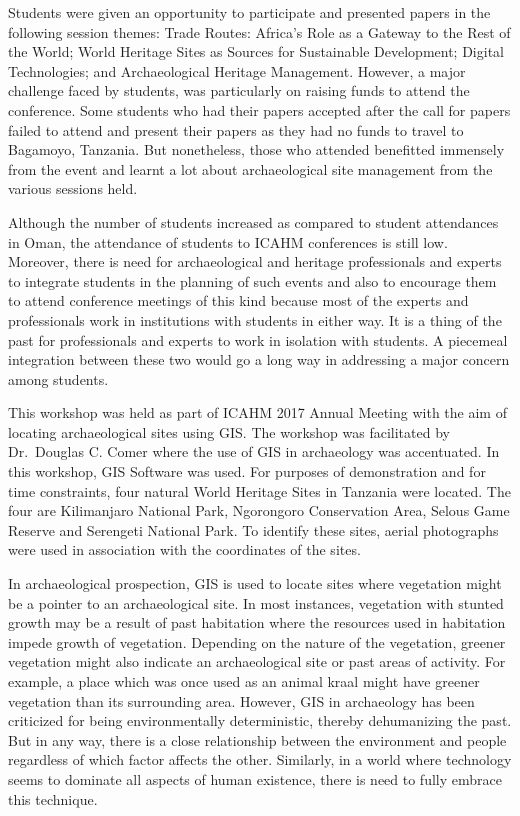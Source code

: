 Students were given an opportunity to participate and presented papers in the following session themes: Trade Routes: Africa's Role as a Gateway to the Rest of the World; World Heritage Sites as Sources for Sustainable Development; Digital Technologies; and Archaeological Heritage Management. However, a major challenge faced by students, was particularly on raising funds to attend the conference. Some students who had their papers accepted after the call for papers failed to attend and present their papers as they had no funds to travel to Bagamoyo, Tanzania. But nonetheless, those who attended benefitted immensely from the event and learnt a lot about archaeological site management from the various sessions held.

Although the number of students increased as compared to student attendances in Oman, the attendance of students to ICAHM conferences is still low. Moreover, there is need for archaeological and heritage professionals and experts to integrate students in the planning of such events and also to encourage them to attend conference meetings of this kind because most of the experts and professionals work in institutions with students in either way. It is a thing of the past for professionals and experts to work in isolation with students. A piecemeal integration between these two would go a long way in addressing a major concern among students.


This workshop was held as part of ICAHM 2017 Annual Meeting with the aim of locating archaeological sites using GIS. The workshop was facilitated by Dr.~Douglas C. Comer where the use of GIS in archaeology was accentuated. In this workshop, GIS Software was used. For purposes of demonstration and for time constraints, four natural World Heritage Sites in Tanzania were located. The four are Kilimanjaro National Park, Ngorongoro Conservation Area, Selous Game Reserve and Serengeti National Park. To identify these sites, aerial photographs were used in association with the coordinates of the sites.

In archaeological prospection, GIS is used to locate sites where vegetation might be a pointer to an archaeological site. In most instances, vegetation with stunted growth may be a result of past habitation where the resources used in habitation impede growth of vegetation. Depending on the nature of the vegetation, greener vegetation might also indicate an archaeological site or past areas of activity. For example, a place which was once used as an animal kraal might have greener vegetation than its surrounding area. However, GIS in archaeology has been criticized for being environmentally deterministic, thereby dehumanizing the past. But in any way, there is a close relationship between the environment and people regardless of which factor affects the other. Similarly, in a world where technology seems to dominate all aspects of human existence, there is need to fully embrace this technique.

